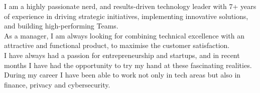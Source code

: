 
\begin{cvparagraph}
    I am a highly passionate nerd, and results-driven technology leader with 7+ years of experience in driving strategic initiatives, implementing innovative solutions, and building high-performing Teams.
    \\As a manager, I am always looking for combining technical excellence with an attractive and functional product, to maximise the customer satisfaction.
    \\I have always had a passion for entrepreneurship and startups, and in recent months I have had the opportunity to try my hand at these fascinating realities.
    \\During my career I have been able to work not only in tech areas but also in finance, privacy and cybersecurity.
\end{cvparagraph}